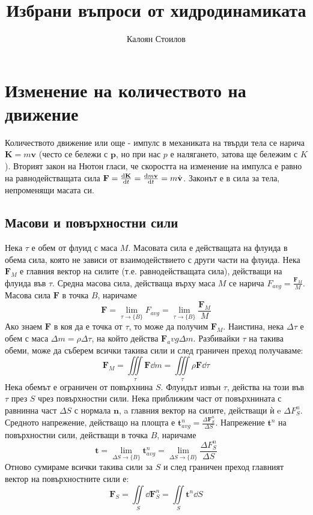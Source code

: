 \documentclass[bulgarian, 12pt]{article}
\title{Избрани въпроси от хидродинамиката}
\author{Калоян Стоилов}
\begin{document}
\maketitle

\section{Изменение на количеството на движение}
Количеството движение или още - импулс в механиката на твърди тела се нарича $\mathbf{K} = m\mathbf{v}$ (често се бележи с $\mathbf{p}$, но при нас $p$ е налягането, затова ще бележим с $K$).
Вторият закон на Нютон гласи, че скоростта на изменение на импулса е равно на равнодействащата сила $\mathbf{F} = \dv{\mathbf{K}}{t} = \dv{m\mathbf{v}}{t}= m \dot{\mathbf{v}}$. 
Законът е в сила за тела, непроменящи масата си.

\subsection{Масови и повърхностни сили}
Нека $\tau$ е обем от флуид с маса $M$. 
Масовата сила е действащата на флуида в обема сила, която не зависи от взаимодействието с други части на флуида. 
Нека $\mathbf{F}_M$ е главния вектор на силите (т.е. равнодействащата сила), действащи на флуида във $\tau$.
Средна масова сила, действаща върху маса $M$ се нарича $F_{avg} = \frac{\mathbf{F}_M}{M}$.
Масова сила $\mathbf{F}$ в точка $B$, наричаме
\begin{equation}
	\mathbf{F} = \lim_{\tau \to \{B\}} F_{avg} = \lim_{\tau \to \{B\}} \frac{\mathbf{F}_M}{M}
\end{equation}
Ако знаем $\mathbf{F}$ в коя да е точка от $\tau$, то може да получим $\mathbf{F}_M$.
Наистина, нека $\Delta \tau$ е обем с маса $\Delta m = \rho \Delta \tau$, на който действа $\mathbf{F}_avg \Delta m$.
Разбивайки $\tau$ на такива обеми, може да съберем всички такива сили и след граничен преход получаваме:
\begin{equation}
	\mathbf{F}_M = \iiint\limits_{\tau} \mathbf{F} \dd m = \iiint\limits_{\tau} \rho \mathbf{F} \dd \tau
\end{equation}
Нека обемът е ограничен от повърхнина $S$. Флуидът извън $\tau$, действа на този във $\tau$ през $S$ чрез повърхностни сили.
Нека приближим част от повърхнината с равнинна част $\Delta S$ с нормала $\mathbf{n}$, a главния вектор на силите, действащи ѝ e $\Delta F_S^n$.
Средното напрежение, действащо на площта е $\mathbf{t}_{avg}^n = \frac{\Delta \mathbf{F}_S^n}{\Delta S}$. 
Напрежение $\mathbf{t}^n$ на повърхностни сили, действащи в точка $B$, наричаме
\begin{equation}
	\mathbf{t} = \lim_{\Delta S \to \{B\}} \mathbf{t}_{avg}^n = \lim_{\Delta S \to \{B\}} \frac{\Delta F_S^n}{\Delta S}
\end{equation}
Отново сумираме всички такива сили за $S$ и след граничен преход главният вектор на повърхностните сили е:
\begin{equation}
	\mathbf{F}_S = \iint\limits_{S} \dd \mathbf{F}_S^n = \iint\limits_{S} \mathbf{t}^n \dd S
\end{equation}
\end{document}
